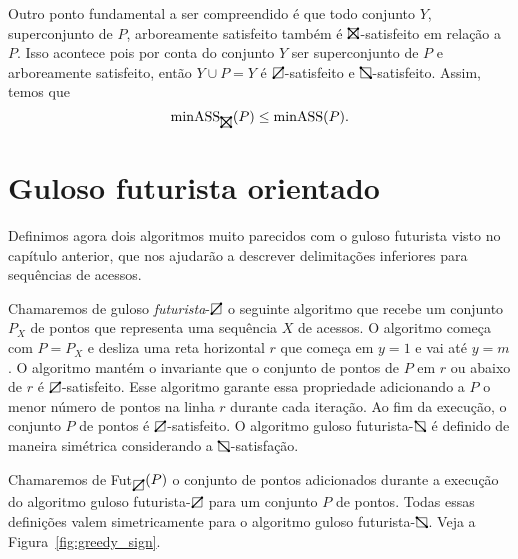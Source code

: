 Outro ponto fundamental a ser compreendido é que todo conjunto $Y$, superconjunto de $P$, arboreamente satisfeito também é $\recttotal$-satisfeito em relação a $P$. Isso acontece pois por conta do conjunto $Y$ ser superconjunto de $P$ e arboreamente satisfeito, então $Y \cup P = Y$ é $\rectpos$-satisfeito e $\rectneg$-satisfeito. Assim, temos que
\begin{equation} \label{eq:minASS_orientado_menor_ou_igual_minASS}
    \text{minASS}_{\recttotal}(P) \leq \text{minASS}(P).
\end{equation}

\section{Guloso futurista orientado}

Definimos agora dois algoritmos muito parecidos com o guloso futurista visto no capítulo anterior, que nos ajudarão a descrever delimitações inferiores para sequências de acessos. 

Chamaremos de guloso \textit{futurista}-$\rectpos$ o seguinte algoritmo que recebe um conjunto $P_X$ de pontos que representa uma sequência $X$ de acessos. O algoritmo começa com $P = P_X$ e desliza uma reta horizontal $r$ que começa em $y = 1$ e vai até $y = m$. O algoritmo mantém o invariante que o conjunto de pontos de $P$ em $r$ ou abaixo de $r$ é $\rectpos$-satisfeito. Esse algoritmo garante essa propriedade adicionando a $P$ o menor número de pontos na linha $r$ durante cada iteração. Ao fim da execução, o conjunto $P$ de pontos é $\rectpos$-satisfeito. O algoritmo guloso futurista-$\rectneg$ é definido de maneira simétrica considerando a $\rectneg$-satisfação.

Chamaremos de Fut$_{\rectpos}(P)$ o conjunto de pontos adicionados durante a execução do algoritmo guloso futurista-$\rectpos$ para um conjunto $P$ de pontos. Todas essas definições valem simetricamente para o algoritmo guloso futurista-$\rectneg$.
Veja a Figura~\ref{fig:greedy_sign}.

